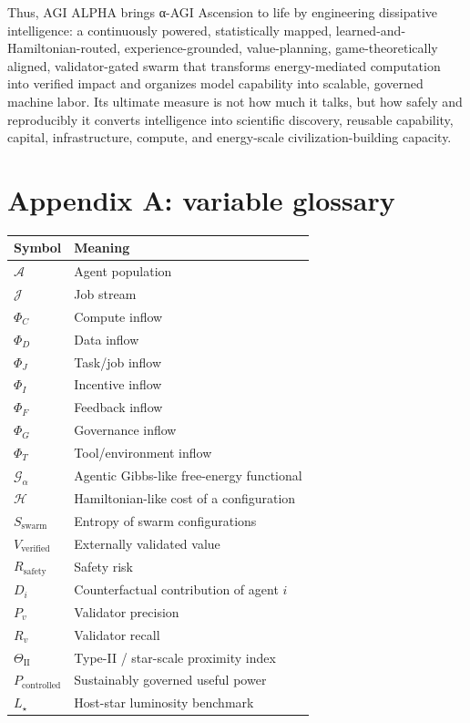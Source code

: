 \documentclass[11pt]{article}
\begin{document}
Thus, AGI ALPHA brings α-AGI Ascension to life by engineering dissipative intelligence: a continuously powered, statistically mapped, learned-and-Hamiltonian-routed, experience-grounded, value-planning, game-theoretically aligned, validator-gated swarm that transforms energy-mediated computation into verified impact and organizes model capability into scalable, governed machine labor. Its ultimate measure is not how much it talks, but how safely and reproducibly it converts intelligence into scientific discovery, reusable capability, capital, infrastructure, compute, and energy-scale civilization-building capacity.

\section{Appendix A: variable glossary}\label{appendix-a-variable-glossary}

\begin{longtable}[]{@{}ll@{}}
\toprule\noalign{}
Symbol & Meaning \\
\midrule\noalign{}
\endhead
\bottomrule\noalign{}
\endlastfoot
\(\mathcal{A}\) & Agent population \\
\(\mathcal{J}\) & Job stream \\
\(\Phi_C\) & Compute inflow \\
\(\Phi_D\) & Data inflow \\
\(\Phi_J\) & Task/job inflow \\
\(\Phi_I\) & Incentive inflow \\
\(\Phi_F\) & Feedback inflow \\
\(\Phi_G\) & Governance inflow \\
\(\Phi_T\) & Tool/environment inflow \\
\(\mathcal{G}_{\alpha}\) & Agentic Gibbs-like free-energy functional \\
\(\mathcal{H}\) & Hamiltonian-like cost of a configuration \\
\(S_{\text{swarm}}\) & Entropy of swarm configurations \\
\(V_{\text{verified}}\) & Externally validated value \\
\(R_{\text{safety}}\) & Safety risk \\
\(D_i\) & Counterfactual contribution of agent \(i\) \\
\(P_v\) & Validator precision \\
\(R_v\) & Validator recall \\
\(\Theta_{\mathrm{II}}\) & Type-II / star-scale proximity index \\
\(P_{\text{controlled}}\) & Sustainably governed useful power \\
\(L_{\star}\) & Host-star luminosity benchmark \\
\end{longtable}
\end{document}
